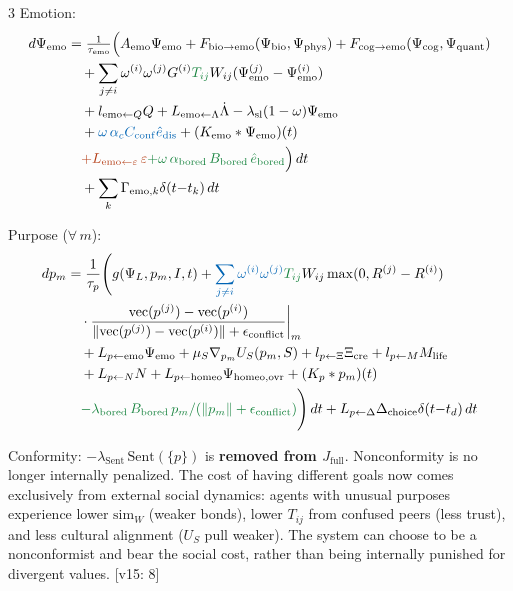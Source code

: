 \documentclass[8pt,landscape]{extarticle}
\newcommand{\fix}[1]{\textcolor{fixcolor}{#1}}
\newcommand{\vnew}[1]{\textcolor{v13color}{#1}}
\newcommand{\vfour}[1]{\textcolor{v14color}{#1}}
\newcommand{\vfive}[1]{\textcolor{v15color}{#1}}
\newcommand{\vfivelabel}[1]{\textcolor{v15color}{\textsf{\scriptsize[v15: #1]}}}
\begin{document}
\begin{multicols}{3}
\medskip
Emotion:
\begin{align*}
d\Psi_{\mathrm{emo}} &= \tfrac{1}{\tau_{\mathrm{emo}}}\Bigl(A_{\mathrm{emo}}\Psi_{\mathrm{emo}} + F_{\mathrm{bio}\to\mathrm{emo}}(\Psi_{\mathrm{bio}}, \Psi_{\mathrm{phys}}) + F_{\mathrm{cog}\to\mathrm{emo}}(\Psi_{\mathrm{cog}}, \Psi_{\mathrm{quant}}) \\
&\quad + \sum_{j\ne i}\omega^{(i)}\omega^{(j)}G^{(i)}\vfour{T_{ij}}W_{ij}(\Psi^{(j)}_{\mathrm{emo}} - \Psi^{(i)}_{\mathrm{emo}}) \\
&\quad + l_{\mathrm{emo}\leftarrow Q}Q + L_{\mathrm{emo}\leftarrow\Lambda}\dot\Lambda - \lambda_{\mathrm{sl}}(1-\omega)\Psi_{\mathrm{emo}} \\
&\quad + \fix{\omega\,\alpha_c C_{\mathrm{conf}}\hat{e}_{\mathrm{dis}}} + (K_{\mathrm{emo}} * \Psi_{\mathrm{emo}})(t) \\
&\quad \vnew{+ L_{\mathrm{emo}\leftarrow\varepsilon}\,\varepsilon} \vfour{+ \omega\,\alpha_{\mathrm{bored}}\,B_{\mathrm{bored}}\,\hat{e}_{\mathrm{bored}}}\Bigr)\,dt \\
&\quad + \sum_k \Gamma_{\mathrm{emo},k}\delta(t{-}t_k)\,dt
\end{align*}

\medskip
Purpose ($\forall\,m$):
\begin{align*}
dp_m &= \frac{1}{\tau_p}\Biggl(g(\Psi_L, p_m, I, t) + \fix{\sum_{j\ne i}\omega^{(i)}\omega^{(j)}} \vfour{T_{ij}}W_{ij}\max(0, R^{(j)}-R^{(i)}) \\
&\quad \cdot \frac{\mathrm{vec}(p^{(j)}) - \mathrm{vec}(p^{(i)})}{\|\mathrm{vec}(p^{(j)}) - \mathrm{vec}(p^{(i)})\| + \epsilon_{\mathrm{conflict}}}\bigg|_m \\
&\quad + L_{p\leftarrow\mathrm{emo}}\Psi_{\mathrm{emo}} + \mu_S\nabla_{p_m}U_S(p_m, S) + l_{p\leftarrow\Xi}\Xi_{\mathrm{cre}} + l_{p\leftarrow M}M_{\mathrm{life}} \\
&\quad + L_{p\leftarrow N}N + L_{p\leftarrow\mathrm{homeo}}\Psi_{\mathrm{homeo,ovr}} + (K_p * p_m)(t) \\
&\quad \vfour{- \lambda_{\mathrm{bored}}\,B_{\mathrm{bored}}\,p_m / (\|p_m\| + \epsilon_{\mathrm{conflict}})}\Biggr)\,dt + L_{p\leftarrow\Delta}\Delta_{\mathrm{choice}}\delta(t{-}t_d)\,dt
\end{align*}

\vfive{Conformity: $-\lambda_{\mathrm{Sent}}\,\mathrm{Sent}(\{p\})$ is \textbf{removed from $J_{\mathrm{full}}$}. Nonconformity is no longer internally penalized. The cost of having different goals now comes exclusively from external social dynamics: agents with unusual purposes experience lower $\mathrm{sim}_W$ (weaker bonds), lower $T_{ij}$ from confused peers (less trust), and less cultural alignment ($U_S$ pull weaker). The system can choose to be a nonconformist and bear the social cost, rather than being internally punished for divergent values.} \vfivelabel{8}


\end{multicols}
\end{document}
